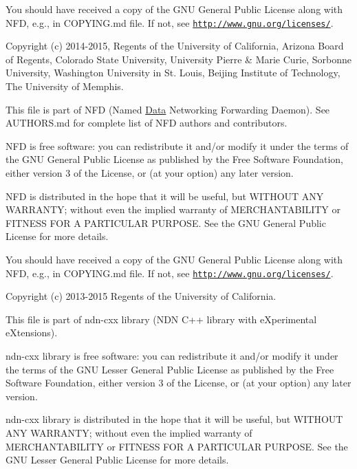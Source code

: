 You should have received a copy of the G\+NU General Public License along with N\+FD, e.\+g., in C\+O\+P\+Y\+I\+N\+G.\+md file. If not, see \href{http://www.gnu.org/licenses/}{\tt http\+://www.\+gnu.\+org/licenses/}.

Copyright (c) 2014-\/2015, Regents of the University of California, Arizona Board of Regents, Colorado State University, University Pierre \& Marie Curie, Sorbonne University, Washington University in St. Louis, Beijing Institute of Technology, The University of Memphis.

This file is part of N\+FD (Named \hyperlink{classndn_1_1Data}{Data} Networking Forwarding Daemon). See A\+U\+T\+H\+O\+R\+S.\+md for complete list of N\+FD authors and contributors.

N\+FD is free software\+: you can redistribute it and/or modify it under the terms of the G\+NU General Public License as published by the Free Software Foundation, either version 3 of the License, or (at your option) any later version.

N\+FD is distributed in the hope that it will be useful, but W\+I\+T\+H\+O\+UT A\+NY W\+A\+R\+R\+A\+N\+TY; without even the implied warranty of M\+E\+R\+C\+H\+A\+N\+T\+A\+B\+I\+L\+I\+TY or F\+I\+T\+N\+E\+SS F\+OR A P\+A\+R\+T\+I\+C\+U\+L\+AR P\+U\+R\+P\+O\+SE. See the G\+NU General Public License for more details.

You should have received a copy of the G\+NU General Public License along with N\+FD, e.\+g., in C\+O\+P\+Y\+I\+N\+G.\+md file. If not, see \href{http://www.gnu.org/licenses/}{\tt http\+://www.\+gnu.\+org/licenses/}.

Copyright (c) 2013-\/2015 Regents of the University of California.

This file is part of ndn-\/cxx library (N\+DN C++ library with e\+Xperimental e\+Xtensions).

ndn-\/cxx library is free software\+: you can redistribute it and/or modify it under the terms of the G\+NU Lesser General Public License as published by the Free Software Foundation, either version 3 of the License, or (at your option) any later version.

ndn-\/cxx library is distributed in the hope that it will be useful, but W\+I\+T\+H\+O\+UT A\+NY W\+A\+R\+R\+A\+N\+TY; without even the implied warranty of M\+E\+R\+C\+H\+A\+N\+T\+A\+B\+I\+L\+I\+TY or F\+I\+T\+N\+E\+SS F\+OR A P\+A\+R\+T\+I\+C\+U\+L\+AR P\+U\+R\+P\+O\+SE. See the G\+NU Lesser General Public License for more details.

